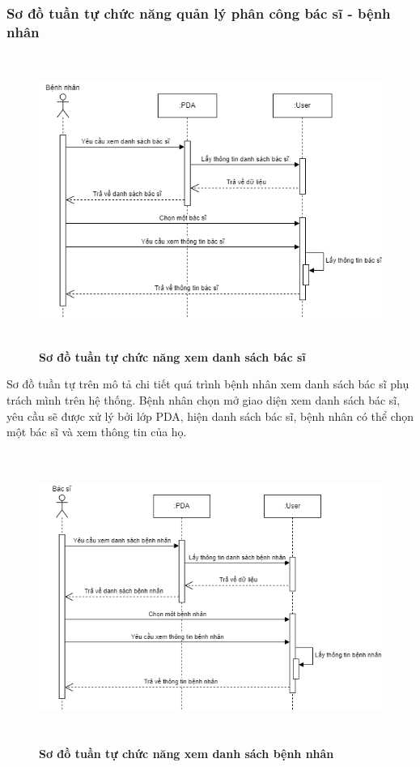 \subsubsection{Sơ đồ tuần tự chức năng quản lý phân công bác sĩ - bệnh nhân}
\begin{figure}[H]
  \centering
  \includegraphics[width=13cm,height=9.5cm]{Images/sequence/sequence_manage_doctor.png}
  \caption[Sơ đồ tuần tự chức năng xem danh sách bác sĩ]{\bfseries \fontsize{12pt}{0pt}
  \selectfont Sơ đồ tuần tự chức năng xem danh sách bác sĩ}
  \label{sequence_manage_doctor} %
\end{figure}
Sơ đồ tuần tự trên mô tả chi tiết quá trình bệnh nhân xem danh sách bác sĩ phụ trách mình trên hệ thống. Bệnh nhân chọn mở giao diện xem danh sách bác sĩ, 
yêu cầu sẽ được xử lý bởi lớp PDA, hiện danh sách bác sĩ, bệnh nhân có thể chọn một bác sĩ và xem thông tin của họ. 
\begin{figure}[H]
  \centering
  \includegraphics[width=13cm,height=9.5cm]{Images/sequence/sequence_manage_patient.png}
  \caption[Sơ đồ tuần tự chức năng xem danh sách bệnh nhân]{\bfseries \fontsize{12pt}{0pt}
  \selectfont Sơ đồ tuần tự chức năng xem danh sách bệnh nhân}
  \label{sequence_manage_patient} %
\end{figure}
